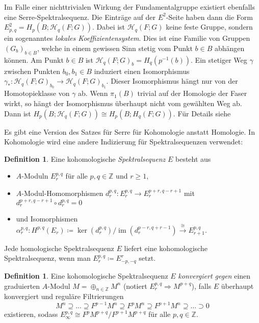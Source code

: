\documentclass[11pt, a4paper, german]{article}
\theoremstyle{definition}
\newtheorem{defn}[lem]{Definition}
\theoremstyle{remark}
\newcommand{\Z}{\mathbb{Z}} %
\DeclareMathOperator{\im}{im} %
\newcommand{\LH}{\mathcal{H}} %
\begin{document}
Im Falle einer nichttrivialen Wirkung der Fundamentalgruppe existiert ebenfalls eine Serre-Spektralsequenz.
Die Einträge auf der $E^2$-Seite haben dann die Form $E^2_{p,q} = H_p(B; \LH_q(F; G))$.
Dabei ist $\LH_q(F; G)$ keine feste Gruppe, sondern ein sogenanntes \emph{lokales Koeffizientensystem}.
Dies ist eine Familie von Gruppen $(G_b)_{b \in B}$, welche in einem gewissen Sinn stetig vom Punkt $b \in B$ abhängen können.
Am Punkt $b \in B$ ist $\LH_q(F; G)_b = H_q(p^{-1}(b))$.
Ein stetiger Weg $\gamma$ zwischen Punkten $b_0, b_1 \in B$ induziert einen Isomorphismus $\gamma_* : \LH_q(F; G)_{b_0} \to \LH_q(F; G)_{b_1}$.
Dieser Isomorphismus hängt nur von der Homotopieklasse von $\gamma$ ab.
Wenn $\pi_1(B)$ trivial auf der Homologie der Faser wirkt, so hängt der Isomorphismus überhaupt nicht vom gewählten Weg ab.
Dann ist $H_p(B; \LH_q(F; G)) \cong H_p(B; H_q(F; G))$.
Für Details siehe \cite[133-185]{mccleary:ss}

Es gibt eine Version des Satzes für Serre für Kohomologie anstatt Homologie.
In Kohomologie wird eine andere Indizierung für Spektralsequenzen verwendet:

\begin{defn}
  Eine kohomologische \emph{Spektralsequenz} $E$ besteht aus
  \begin{itemize}
    \item $A$-Moduln $E_r^{p,q}$ für alle $p, q \in \Z$ und $r \geq 1$,
    \item $A$-Modul-Homomorphismen $d_r^{p,q} : E_r^{p,q} \to E_r^{p+r,q-r+1}$ mit $d_r^{p+r,q-r+1} \circ d_r^{p,q} = 0$
    \item und Isomorphismen $\alpha_r^{p,q} : H^{p,q}(E_r) \!\coloneqq\! \ker(d_r^{p,q}) / \im(d_r^{p-r,q+r-1}) \xrightarrow{\cong} E_{r+1}^{p,q}$.
  \end{itemize}
\end{defn}

Jede homologische Spektralsequenz $E$ liefert eine kohomologische Spektralsequenz, wenn man $E_r^{p,q} \coloneqq E^r_{-p,-q}$ setzt.

\begin{defn}
  Eine kohomologische Spektralsequenz $E$ \emph{konvergiert gegen} einen graduierten $A$-Modul $M = \oplus_{n \in \Z} M^n$ (notiert $E_r^{p,q} \Rightarrow M^{p+q}$), falls $E$ überhaupt konvergiert und reguläre Filtrierungen
  \[ M^n \supseteq \ldots \supseteq F^{p-1} M^n \supseteq F^p M^n \supseteq F^{p+1} M^n \supseteq \ldots \supset 0 \]
  existieren, sodass $E_\infty^{p,q} \cong F^p M^{p+q} / F^{p+1} M^{p+q}$ für alle $p, q \in \Z$.
\end{defn}
\end{document}
